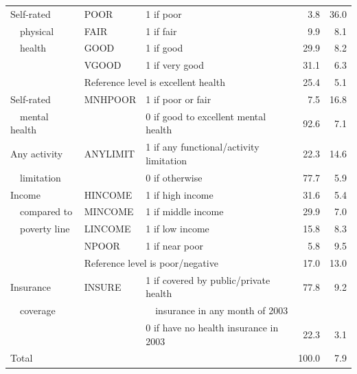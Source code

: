 \begin{table}[h]
\begin{center}
\begin{tabular}{lllrr}
Self-rated & POOR & 1 if poor & 3.8 & 36.0 \\
\ \ physical& FAIR & 1 if fair & 9.9 & 8.1 \\
\ \ health & GOOD & 1 if good & 29.9  &  8.2 \\
& VGOOD & 1 if very good & 31.1  &  6.3 \\
&  \multicolumn{2}{l}{Reference level is excellent health} & 25.4  &  5.1 \\
Self-rated & MNHPOOR & 1 if poor or fair & 7.5 & 16.8  \\
\ \ mental health &  & 0 if good to excellent mental health & 92.6 &  7.1 \\
Any activity & ANYLIMIT & 1 if any functional/activity limitation&
22.3  & 14.6  \\
\ \ limitation &  & 0 if otherwise & 77.7 & 5.9
\\
\hline Income & HINCOME  & 1 if high income & 31.6 & 5.4 \\
\ \ compared to & MINCOME & 1 if middle income & 29.9 & 7.0 \\
\ \ poverty line & LINCOME & 1 if low income & 15.8 & 8.3 \\
& NPOOR & 1 if near poor & 5.8 & 9.5
\\
& \multicolumn{2}{l}{Reference level is poor/negative} & 17.0 & 13.0
\\ \hline Insurance & INSURE & 1 if covered by public/private health
& 77.8 &  9.2 \\
\ \ coverage &  & \ \ insurance in any month of 2003 &  &
 \\
&  & 0 if have no health insurance in 2003 & 22.3 & 3.1
\\ \hline
Total &  &  & 100.0 & 7.9 \\ \hline
\end{tabular}
\end{center}\end{table}


\bigskip


